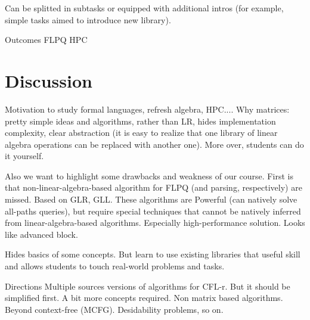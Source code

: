 \documentclass[sigconf]{acmart}
\begin{document}
Can be splitted in subtasks or equipped with additional intros (for example, simple tasks aimed to introduce new library). 

Outcomes 
FLPQ
HPC

\section{Discussion}

Motivation to study formal languages, refresh algebra, HPC....
Why matrices: pretty simple ideas and algorithms, rather than LR, hides implementation complexity, clear abstraction (it is easy to realize that one library of linear algebra operations can be replaced with another one). More over, students can do it yourself.

Also we want to highlight some drawbacks and weakness of our course.
First is that non-linear-algebra-based algorithm for FLPQ (and parsing, respectively) are missed. Based on GLR, GLL. These algorithms are Powerful (can natively solve all-paths queries), but require special techniques that cannot be natively inferred from linear-algebra-based algorithms. Especially high-performance solution. Looks like advanced block. 

Hides basics of some concepts. But learn to use existing libraries that useful skill and allows students to touch real-world problems and tasks.

Directions 
Multiple sources versions of algorithms for CFL-r. But it should be simplified first. A bit more concepts required.
Non matrix based algorithms.
Beyond context-free (MCFG). Desidability problems, so on.




\end{document}
